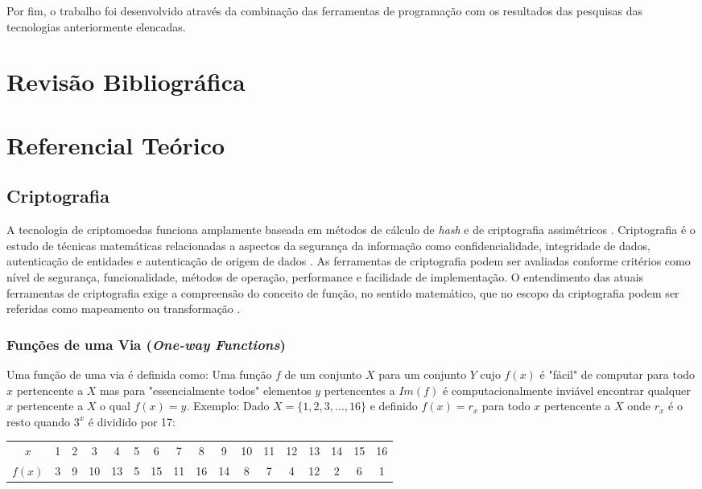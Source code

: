 \documentclass[
	article,			%
	11pt,				%
	oneside,			%
	a4paper,			%
	chapter=TITLE,		%
	section=TITLE,		%
	subsection=TITLE,	%
	subsubsection=TITLE, %
	english,			%
	brazil,				%
	sumario=tradicional
	]{ifrs-artigo-abntex2}
\begin{document}
Por fim, o trabalho foi desenvolvido através da combinação das ferramentas de programação com os resultados das pesquisas das tecnologias anteriormente elencadas.

\section{Revisão Bibliográfica}

\section{Referencial Teórico}

\subsection{Criptografia}
A tecnologia de criptomoedas funciona amplamente baseada em métodos de cálculo de \textit{hash} e de criptografia assimétricos \cite{masterBit}. Criptografia é o estudo de técnicas matemáticas relacionadas a aspectos da segurança da informação como confidencialidade, integridade de dados, autenticação de entidades e autenticação de origem de dados \cite{katz1996handbook}.
As ferramentas de criptografia podem ser avaliadas conforme critérios como nível de segurança, funcionalidade, métodos de operação, performance e facilidade de implementação. O entendimento das atuais ferramentas de criptografia exige  a compreensão do conceito de função, no sentido matemático, que no escopo da criptografia podem ser referidas como mapeamento ou transformação \cite{katz1996handbook}.

\subsubsection{Funções de uma Via (\textit{One-way Functions})}
Uma função  de uma via é definida como: Uma função $f$ de um conjunto $X$ para um conjunto $Y$ cujo $f(x)$ é "fácil" de computar para todo $x$ pertencente a $X$ mas para "essencialmente todos" elementos $y$ pertencentes a $Im(f)$ é computacionalmente inviável encontrar qualquer $x$ pertencente a $X$ o qual $f(x) = y$. Exemplo: Dado $X = \{1,2,3,...,16\}$ e definido $f(x) = r_x$ para todo $x$ pertencente a $X$ onde $r_x$ é o resto quando $3^x$ é dividido por 17:

\begin{table}[htb]
  \begin{center}
    \label{tabela-oneway}
    \begin{tabular}{|c|c|c|c|c|c|c|c|c|c|c|c|c|c|c|c|c|}
      \hline
      $x$ & 1 & 2 & 3 & 4 & 5 & 6 & 7 & 8 & 9 & 10 & 11 & 12 & 13 & 14 & 15 & 16 \\
      $f(x)$ & 3 & 9 & 10 & 13 & 5 & 15 & 11 & 16 & 14 & 8 & 7 & 4 & 12 & 2 & 6 & 1 \\
      \hline
    \end{tabular}
  \end{center}
\end{table}
\end{document}
